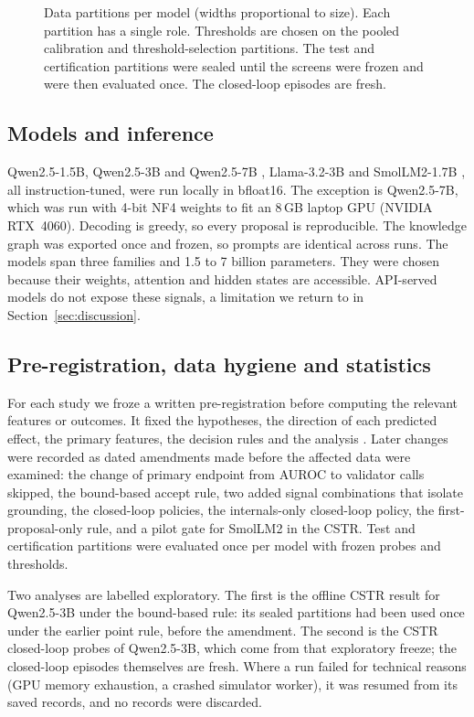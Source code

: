 \begin{figure}[!htbp]
\centering

\caption{Data partitions per model (widths proportional to size). Each partition has a single role.
Thresholds are chosen on the pooled calibration and threshold-selection partitions. The test and certification
partitions were sealed until the screens were frozen and were then evaluated once. The closed-loop episodes are
fresh.}
\label{fig:protocol}
\end{figure}



\subsection{Models and inference}
Qwen2.5-1.5B, Qwen2.5-3B and Qwen2.5-7B \citep{qwen2025}, Llama-3.2-3B \citep{llama3} and SmolLM2-1.7B
\citep{allal2025smollm2}, all instruction-tuned, were run locally in bfloat16. The exception is Qwen2.5-7B,
which was run with 4-bit NF4 weights \citep{dettmers2023qlora} to fit an 8\,GB laptop GPU (NVIDIA RTX~4060).
Decoding is greedy, so every proposal is reproducible. The knowledge graph was exported once and frozen, so
prompts are identical across runs. The models span three families and 1.5 to 7 billion parameters. They
were chosen because their weights, attention and hidden states are accessible. API-served models do not expose
these signals, a limitation we return to in Section~\ref{sec:discussion}.

\subsection{Pre-registration, data hygiene and statistics}
For each study we froze a written pre-registration before computing the relevant features or outcomes. It
fixed the hypotheses, the direction of each predicted effect, the primary features, the decision rules and the
analysis \citep{nosek2018preregistration}. Later changes were recorded as dated amendments made before the
affected data were examined: the change of primary endpoint from AUROC to validator calls skipped, the
bound-based accept rule, two added signal combinations that isolate grounding, the closed-loop policies, the
internals-only closed-loop policy, the first-proposal-only rule, and a pilot gate for SmolLM2 in the CSTR. Test
and certification partitions were evaluated once per model with frozen probes and thresholds.

Two analyses are labelled exploratory. The first is the offline CSTR result for Qwen2.5-3B under the bound-based
rule: its sealed partitions had been used once under the earlier point rule, before the amendment. The second is
the CSTR closed-loop probes of Qwen2.5-3B, which come from that exploratory freeze; the closed-loop episodes
themselves are fresh. Where a run failed for technical reasons (GPU memory exhaustion, a crashed simulator
worker), it was resumed from its saved records, and no records were discarded.

